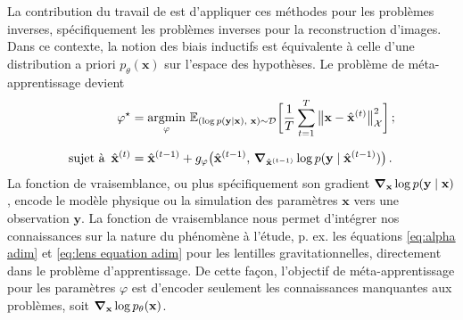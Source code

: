 La contribution du travail de \citet{Putzky2017} est d'appliquer ces méthodes pour les problèmes inverses, spécifiquement les 
problèmes inverses pour la reconstruction d'images. Dans ce contexte, la notion des biais inductifs est 
équivalente à celle d'une distribution a priori $p_\theta(\mathbf{x})$ sur l'espace 
des hypothèses. Le problème de méta-apprentissage devient
\begin{equation}\label{eq:loss intro}
        \begin{aligned}
                \varphi^{\star} &= \underset{\varphi}{\mathrm{argmin}}\,\, 
        \mathbb{E}_{(\log p(\mathbf{y} \mid \mathbf{x}),\,\, \mathbf{x}) \sim \mathcal{D}} 
        \bigg[ \frac{1}{T} \sum_{t=1}^{T} \big\lVert \mathbf{x} - \hat{\mathbf{x}}^{(t)} \big\rVert^{2}_{\mathcal{X}}  \bigg]\,; \\[1.5ex]
        \text{sujet à}\,\,\,\hat{\mathbf{x}}^{(t)} &= 
        \hat{\mathbf{x}}^{(t-1)} + g_\varphi\big(\hat{\mathbf{x}}^{(t-1)},\, \grad_{\hat{\mathbf{x}}^{(t-1)}} \log p(\mathbf{y} \mid \hat{\mathbf{x}}^{(t-1)}) \big)\, .
        \end{aligned}
\end{equation} 
La fonction de vraisemblance, ou plus spécifiquement son gradient $\grad_{\mathbf{x}}\log p(\mathbf{y} \mid \mathbf{x})$, 
encode le modèle physique ou la simulation des paramètres $\mathbf{x}$ vers une observation $\mathbf{y}$.
La fonction de vraisemblance nous permet d'intégrer nos connaissances sur la nature du phénomène à l'étude, 
p. ex. les équations \eqref{eq:alpha adim} et \eqref{eq:lens equation adim} 
pour les lentilles gravitationnelles, directement dans le problème d'apprentissage.
De cette façon, l'objectif de méta-apprentissage pour les paramètres $\varphi$ est d'encoder seulement 
les connaissances manquantes aux problèmes, soit $\grad_{\mathbf{x}}\log p_\theta(\mathbf{x})$.




